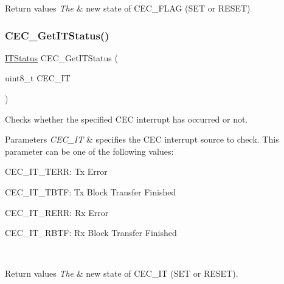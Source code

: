 \begin{DoxyRetVals}{Return values}
{\em The} & new state of C\+E\+C\+\_\+\+F\+L\+AG (S\+ET or R\+E\+S\+ET) \\
\hline
\end{DoxyRetVals}
\mbox{\label{group___c_e_c___exported___functions_gaa1940a388d0bfcefe7483fb74cc2ba1d}} 
\subsubsection{\texorpdfstring{CEC\_GetITStatus()}{CEC\_GetITStatus()}}
{\footnotesize\ttfamily \mbox{\hyperlink{group___exported__types_gaacbd7ed539db0aacd973a0f6eca34074}{I\+T\+Status}} C\+E\+C\+\_\+\+Get\+I\+T\+Status (\begin{DoxyParamCaption}\item[{uint8\+\_\+t}]{C\+E\+C\+\_\+\+IT }\end{DoxyParamCaption})}



Checks whether the specified C\+EC interrupt has occurred or not. 


\begin{DoxyParams}{Parameters}
{\em C\+E\+C\+\_\+\+IT} & specifies the C\+EC interrupt source to check. This parameter can be one of the following values\+: \begin{DoxyItemize}
\item C\+E\+C\+\_\+\+I\+T\+\_\+\+T\+E\+RR\+: Tx Error \item C\+E\+C\+\_\+\+I\+T\+\_\+\+T\+B\+TF\+: Tx Block Transfer Finished \item C\+E\+C\+\_\+\+I\+T\+\_\+\+R\+E\+RR\+: Rx Error \item C\+E\+C\+\_\+\+I\+T\+\_\+\+R\+B\+TF\+: Rx Block Transfer Finished \end{DoxyItemize}
\\
\hline
\end{DoxyParams}

\begin{DoxyRetVals}{Return values}
{\em The} & new state of C\+E\+C\+\_\+\+IT (S\+ET or R\+E\+S\+ET). \\
\hline
\end{DoxyRetVals}
\mbox{\label{group___c_e_c___exported___functions_gaf48aee745a16370372b3eaa7cf3ed22b}} 
